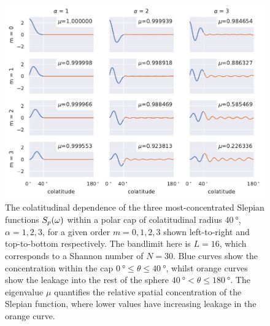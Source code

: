 \begin{figure}[htpb]
	\centering\capstart{}
	\includegraphics[width=\textwidth]{slepian_colatitude.pdf}
	\caption[
		The colatitudinal dependence of the polar cap Slepian functions
	]{
		The colatitudinal dependence of the three most-concentrated Slepian functions \({S}_{p}(\omega)\) within a polar cap of colatitudinal radius \(\SI{40}{\degree}\), \ie{} \(\alpha=1,2,3\), for a given order \(m=0,1,2,3\) shown left-to-right and top-to-bottom respectively.
		The bandlimit here is  \(L=16\), which corresponds to a Shannon number of \(N=30\).
		Blue curves show the concentration within the cap \(\SI{0}{\degree} \leq \theta \leq \SI{40}{\degree}\), whilst orange curves show the leakage into the rest of the sphere \(\SI{40}{\degree} < \theta \leq \SI{180}{\degree}\).
		The eigenvalue \(\mu\) quantifies the relative spatial concentration of the Slepian function, where lower values have increasing leakage in the orange curve.
	}\label{fig:chapter2_slepian_colatitude}
\end{figure}
